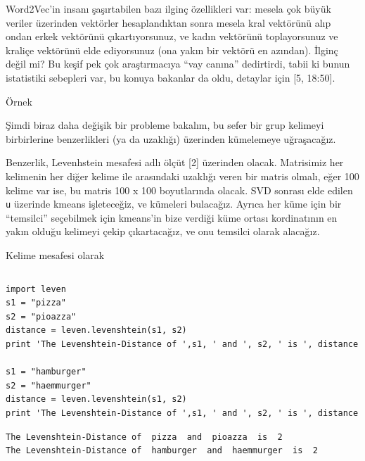 \documentclass[12pt,fleqn]{article}\usepackage{../../common}
\begin{document}
Word2Vec'in insanı şaşırtabilen bazı ilginç özellikleri var: mesela çok
büyük veriler üzerinden vektörler hesaplandıktan sonra mesela kral
vektörünü alıp ondan erkek vektörünü çıkartıyorsunuz, ve kadın vektörünü
toplayorsunuz ve kraliçe vektörünü elde ediyorsunuz (ona yakın bir vektörü
en azından). İlginç değil mi? Bu keşif pek çok araştırmacıya ``vay canına''
dedirtirdi, tabii ki bunun istatistiki sebepleri var, bu konuya bakanlar da
oldu, detaylar için [5, 18:50]. 

Örnek

Şimdi biraz daha değişik bir probleme bakalım, bu sefer bir grup kelimeyi
birbirlerine benzerlikleri (ya da uzaklığı) üzerinden kümelemeye uğraşacağız.

Benzerlik, Levenhstein mesafesi adlı ölçüt [2] üzerinden olacak. Matrisimiz her
kelimenin her diğer kelime ile arasındaki uzaklığı veren bir matris olmalı, eğer
100 kelime var ise, bu matris 100 x 100 boyutlarında olacak. SVD sonrası elde
edilen \verb!u! üzerinde kmeans işleteceğiz, ve kümeleri bulacağız. Ayrıca her
küme için bir ``temsilci'' seçebilmek için kmeans'in bize verdiği küme ortası
kordinatının en yakın olduğu kelimeyi çekip çıkartacağız, ve onu temsilci olarak
alacağız.

Kelime mesafesi olarak

\inputminted[fontsize=\footnotesize]{python}{leven.py}

\begin{verbatim}
import leven
s1 = "pizza"
s2 = "pioazza"   
distance = leven.levenshtein(s1, s2)       
print 'The Levenshtein-Distance of ',s1, ' and ', s2, ' is ', distance

s1 = "hamburger"
s2 = "haemmurger"   
distance = leven.levenshtein(s1, s2)       
print 'The Levenshtein-Distance of ',s1, ' and ', s2, ' is ', distance
\end{verbatim}

\begin{verbatim}
The Levenshtein-Distance of  pizza  and  pioazza  is  2
The Levenshtein-Distance of  hamburger  and  haemmurger  is  2
\end{verbatim}
\end{document}

